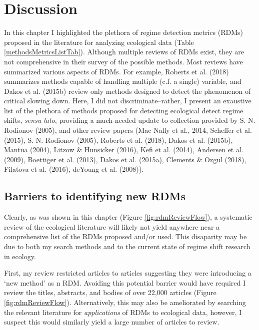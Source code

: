 \documentclass[12pt,twoside,openany]{reedthesis}
\begin{document}
\section{Discussion}\label{discussion}

In this chapter I highlighted the plethora of regime detection metrics
(RDMs) proposed in the literature for analyzing ecological data (Table
\ref{methodsMetricsListTab}). Although multiple reviews of RDMs exist,
they are not comprehensive in their survey of the possible methods. Most
reviews have summarized various aspects of RDMs. For example, Roberts et
al. (2018) summarizes methods capable of handling multiple (c.f. a
single) variable, and Dakos et al. (2015b) review only methods designed
to detect the phenomenon of critical slowing down. Here, I did not
discriminate--rather, I present an exaustive list of the plethora of
methods proposed for detecting ecological detect regime shifts,
\emph{sensu lato}, providing a much-needed update to collection provided
by S. N. Rodionov (2005), and other review papers (Mac Nally et al.,
2014, Scheffer et al. (2015), S. N. Rodionov (2005), Roberts et al.
(2018), Dakos et al. (2015b), Mantua (2004), Litzow \& Hunsicker (2016),
Kefi et al. (2014), Andersen et al. (2009), Boettiger et al. (2013),
Dakos et al. (2015a), Clements \& Ozgul (2018), Filatova et al. (2016),
deYoung et al. (2008)).

\subsection{Barriers to identifying new
RDMs}\label{barriers-to-identifying-new-rdms}

Clearly, as was shown in this chapter (Figure \ref{fig:rdmReviewFlow}),
a systematic review of the ecological literature will likely not yield
anywhere near a comprehensive list of the RDMs proposed and/or used.
This disaparity may be due to both my search methods and to the current
state of regime shift research in ecology.

First, my review restricted articles to articles suggesting they were
introducing a `new method' as n RDM. Avoiding this potential barrier
would have required I review the titles, abstracts, and bodies of over
22,000 articles (Figure \ref{fig:rdmReviewFlow}). Alternatively, this
may also be ameliorated by searching the relevant literature for
\emph{applications} of RDMs to ecological data, however, I suspect this
would similarly yield a large number of articles to review.
\end{document}
